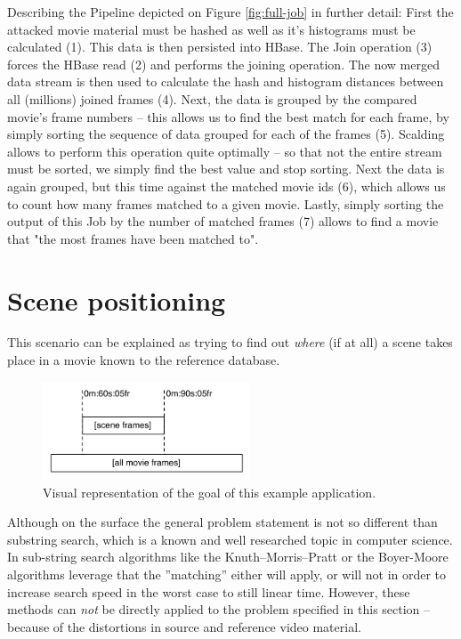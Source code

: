 Describing the Pipeline depicted on Figure \ref{fig:full-job} in further detail: First the attacked movie material must be hashed as well as it's histograms must be calculated (1). This data is then persisted into HBase. The Join operation (3) forces the HBase read (2) and performs the joining operation. The now merged data stream is then used to calculate the hash and histogram distances between all (millions) joined frames (4). Next, the data is grouped by the compared movie's frame numbers -- this allows us to find the best match for each frame, by simply sorting the sequence of data grouped for each of the frames (5). Scalding allows to perform this operation quite optimally -- so that not the entire stream must be sorted, we simply find the best value and stop sorting. Next the data is again grouped, but this time against the matched movie ids (6), which allows us to count how many frames matched to a given movie. Lastly, simply sorting the output of this Job by the number of matched frames (7) allows to find a movie that "the most frames have been matched to".


\section{Scene positioning}
\label{sec:scene-detection}
This scenario can be explained as trying to find out \textit{where} (if at all) a scene takes place in a movie known to the reference database. 

\begin{figure}[ch!]
  \centering
  \includegraphics[width=0.55\textwidth]{img/frames-timeline-matching}
  \caption{Visual representation of the goal of this example application.}
\end{figure}

Although on the surface the general problem statement is not so different than substring search, which is a known and well researched topic in computer science. In sub-string search algorithms like the Knuth–Morris–Pratt \cite{kmp-string-search} or the Boyer-Moore \cite{boyer-string-search} algorithms leverage that the ''matching'' either will apply, or will not in order to increase search speed in the worst case to still linear time. However, these methods can \textit{not} be directly applied to the problem specified in this section -- because of the distortions in source and reference video material.

